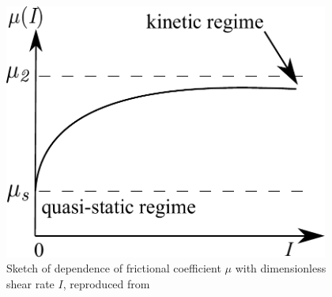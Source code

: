 \begin{figure}[tbhp]
\centering
\includegraphics[width=0.95\textwidth]{mu}
\caption[Dependence of frictional coefficient $\mu$ with dimensionless shear 
rate $\textit{I}$]{Sketch of dependence of frictional coefficient $\mu$ with 
dimensionless shear rate $\textit{I}$, reproduced from~\citet{Pouliquen2006}}
\label{fig:mu}
\end{figure}

